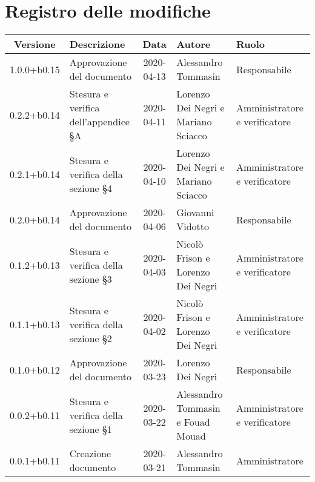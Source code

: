 \section*{Registro delle modifiche}

\begin{center}
	\begin{longtable}{|c|p{3.5cm}|c|p{3cm}|p{3cm}|}
	\hline
	\rowcolor{lighter-grayer}
	\textbf{Versione} & \textbf{Descrizione} & \textbf{Data} & \textbf{Autore} & \textbf{Ruolo} \\
	\hline
	\endfirsthead
	
	1.0.0+b0.15 & Approvazione del documento & 2020-04-13 & Alessandro Tommasin & Responsabile \\
	\hline
	0.2.2+b0.14 & Stesura e verifica dell'appendice \S A & 2020-04-11 & Lorenzo Dei Negri e Mariano Sciacco & Amministratore e verificatore \\
	\hline
	0.2.1+b0.14 & Stesura e verifica della sezione \S4 & 2020-04-10 & Lorenzo Dei Negri e Mariano Sciacco & Amministratore e verificatore \\
	\hline
	0.2.0+b0.14 & Approvazione del documento & 2020-04-06 & Giovanni Vidotto & Responsabile \\
	\hline
	0.1.2+b0.13 & Stesura e verifica della sezione \S3 & 2020-04-03 & Nicolò Frison e Lorenzo Dei Negri & Amministratore e verificatore \\
	\hline
	0.1.1+b0.13 & Stesura e verifica della sezione \S2 & 2020-04-02 & Nicolò Frison e Lorenzo Dei Negri & Amministratore e verificatore \\
	\hline
	0.1.0+b0.12 & Approvazione del documento & 2020-03-23 & Lorenzo Dei Negri & Responsabile \\
	\hline
	0.0.2+b0.11 & Stesura e verifica della sezione \S1 & 2020-03-22 & Alessandro Tommasin e Fouad Mouad & Amministratore e verificatore \\
	\hline
	0.0.1+b0.11 & Creazione documento & 2020-03-21 & Alessandro Tommasin & Amministratore \\
	\hline
	\hline
	\end{longtable}
\end{center}